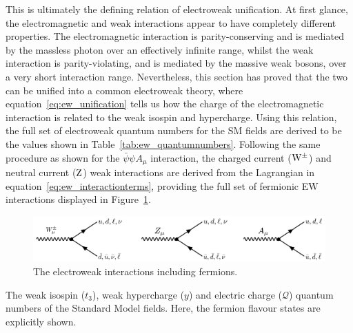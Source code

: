 \noindent
This is ultimately the defining relation of electroweak unification. At first glance, the electromagnetic and weak interactions appear to have completely different properties. The electromagnetic interaction is parity-conserving and is mediated by the massless photon over an effectively infinite range, whilst the weak interaction is parity-violating, and is mediated by the massive weak bosons, over a very short interaction range. Nevertheless, this section has proved that the two can be unified into a common electroweak theory, where equation~\ref{eq:ew_unification} tells us how the charge of the electromagnetic interaction is related to the weak isospin and hypercharge. Using this relation, the full set of electroweak quantum numbers for the SM fields are derived to be the values shown in Table~\ref{tab:ew_quantumnumbers}. Following the same procedure as shown for the $\bar{\psi}\psi A_\mu$ interaction, the charged current (${\rm{W}}^{\pm}$) and neutral current (${\rm{Z}}$) weak interactions are derived from the Lagrangian in equation~\ref{eq:ew_interactionterms}, providing the full set of fermionic EW interactions displayed in Figure~\ref{fig:feynman_ew}.

\begin{figure}
  \centering
  \includegraphics[width=.9\linewidth]{Figures/theory/ew_interaction.pdf}
  \caption[The electroweak interaction including fermions]
  {
    The electroweak interactions including fermions.
  }
  \label{fig:feynman_ew}
\end{figure}

\begin{table}
    \caption[The electroweak quantum numbers of the SM fields]{The weak isospin ($t_3$), weak hypercharge ($y$) and electric charge ($\mathcal{Q}$) quantum numbers of the Standard Model fields. Here, the fermion flavour states are explicitly shown.}
    \label{tab:ew_quantumnumbers}
    \centering
    \renewcommand{\arraystretch}{1.2}
    \setlength{\tabcolsep}{20pt}
    
\end{table}

